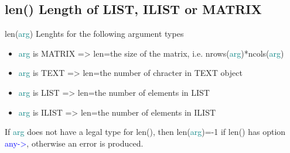 \subsection{\textcolor{VioletRed}{len}() Length of LIST, ILIST or MATRIX}
\label{len}
\textcolor{VioletRed}{len}(\textcolor{teal}{arg})  Lenghts for the following argument types
\begin{itemize}
\item  \textcolor{teal}{arg} is MATRIX => len=the size of the matrix, i.e.
\textcolor{VioletRed}{nrows}(\textcolor{teal}{arg})*ncols(\textcolor{teal}{arg})

\item  \textcolor{teal}{arg} is TEXT => len=the number of chracter in TEXT object

\item  \textcolor{teal}{arg} is LIST => len=the number of elements in LIST
\item  \textcolor{teal}{arg} is ILIST => len=the number of elements in ILIST
\end{itemize}
If \textcolor{teal}{arg} does not have a legal type for \textcolor{VioletRed}{len}(), then \textcolor{VioletRed}{len}(\textcolor{teal}{arg})=-1 if \textcolor{VioletRed}{len}() has
option \textcolor{blue}{any->}, otherwise an error is produced.
